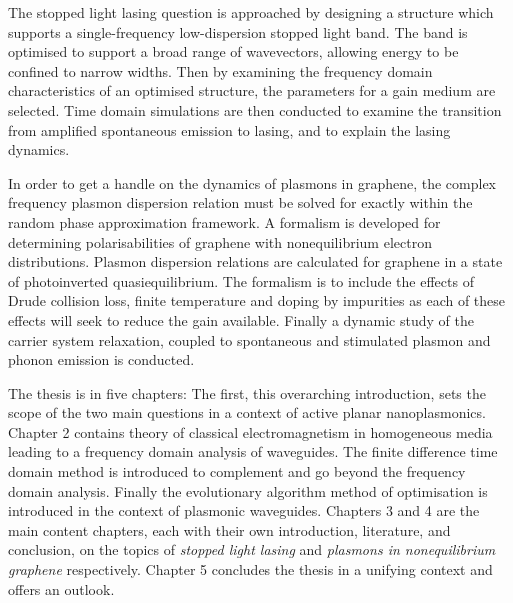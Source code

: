 The stopped light lasing question is approached by designing a structure
which supports a single-frequency low-dispersion stopped light band.
The band is optimised to support a broad range of wavevectors, allowing
energy to be confined to narrow widths.
Then by examining the frequency domain characteristics of an optimised
structure, the parameters for a gain medium are selected.
Time domain simulations are then conducted to examine the transition from
amplified spontaneous emission to lasing, and to explain the lasing dynamics.

In order to get a handle on the dynamics of plasmons in graphene, the complex
frequency plasmon dispersion relation must be solved for exactly within the
random phase approximation framework.
A formalism is developed for determining polarisabilities of graphene with
nonequilibrium electron distributions.
Plasmon dispersion relations are calculated for graphene in a state of
photoinverted quasiequilibrium.
The formalism is to include the effects of Drude collision loss, finite
temperature and doping by impurities as each of these effects will seek to
reduce the gain available.
Finally a dynamic study of the carrier system relaxation, coupled to spontaneous
and stimulated plasmon and phonon emission is conducted.

The thesis is in five chapters:
The first, this overarching introduction, sets the scope of the two main
questions in a context of active planar nanoplasmonics.
Chapter 2 contains theory of classical electromagnetism in homogeneous media
leading to a frequency domain analysis of waveguides.
The finite difference time domain method is introduced to complement and go
beyond the frequency domain analysis.
Finally the evolutionary algorithm method of optimisation is introduced in the
context of plasmonic waveguides.
Chapters 3 and 4 are the main content chapters, each with their own
introduction, literature, and conclusion, on the topics of
\emph{stopped light lasing} and
\emph{plasmons in nonequilibrium graphene} respectively.
Chapter 5 concludes the thesis in a unifying context and offers an outlook.
